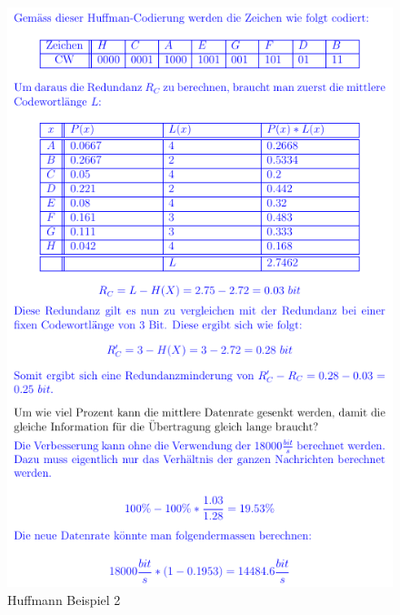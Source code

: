 \begin{figure}[h!]
	\centering
	\begin{minipage}[t]{0.9\textwidth}
		\centering
		\includegraphics[width=0.9\linewidth]{images/beispielhuffmann2}
		\caption{Huffmann Beispiel 2}
		\label{fig:huffmannbeispiel2}
	\end{minipage}
\end{figure}
\clearpage

